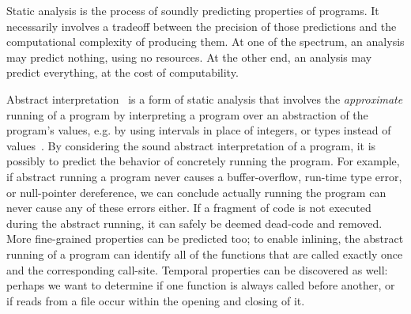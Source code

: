 Static analysis is the process of soundly predicting properties of
programs.
%
It necessarily involves a tradeoff between the precision of those
predictions and the computational complexity of producing them.
%
At one of the spectrum, an analysis may predict nothing, using no
resources.  At the other end, an analysis may predict everything, at
the cost of computability.

Abstract interpretation~\cite{Cousot} is a form of static analysis
that involves the \emph{approximate} running of a program by
interpreting a program over an abstraction of the program's values,
e.g. by using intervals in place of integers, or types instead of
values~\cite{Kuan}.
%
By considering the sound abstract interpretation of a program, it is
possibly to predict the behavior of concretely running the program. 
%
For example, if abstract running a program never causes a
buffer-overflow, run-time type error, or null-pointer dereference, we
can conclude actually running the program can never cause any of these
errors either.  If a fragment of code is not executed during the
abstract running, it can safely be deemed dead-code and removed.  More
fine-grained properties can be predicted too; to enable inlining, the
abstract running of a program can identify all of the functions that
are called exactly once and the corresponding call-site.  Temporal
properties can be discovered as well: perhaps we want to determine if
one function is always called before another, or if reads from a file
occur within the opening and closing of it.








